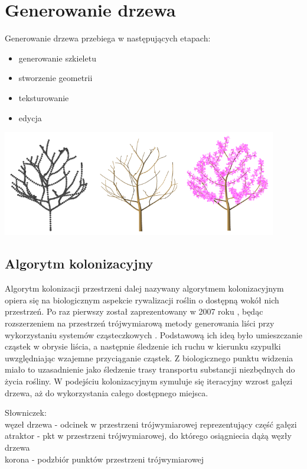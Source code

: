 \section{Generowanie drzewa}
Generowanie drzewa przebiega w następujących etapach:
\begin{itemize}
\item generowanie szkieletu
\item stworzenie geometrii
\item teksturowanie
\item edycja
\end{itemize}
\begin{center}
	\includegraphics[width=120mm]{images/colonization/generation.png}
	\label{two_segments}
\end{center}
\subsection{Algorytm kolonizacyjny}
Algorytm kolonizacji przestrzeni dalej nazywany algorytmem kolonizacyjnym opiera się na biologicznym aspekcie rywalizacji roślin o dostępną wokół nich przestrzeń. 
Po raz pierwszy został zaprezentowany w 2007 roku \cite{spaceColonization}, będąc rozszerzeniem na przestrzeń trójwymiarową metody generowania liści przy wykorzystaniu systemów cząsteczkowych \cite{particleMethod}. 
Podstawową ich ideą było umieszczanie cząstek w obrysie liścia, a następnie śledzenie ich ruchu w kierunku szypułki uwzględniając wzajemne przyciąganie cząstek. 
Z biologicznego punktu widzenia miało to uzasadnienie jako śledzenie trasy transportu substancji niezbędnych do życia rośliny. 
W podejściu kolonizacyjnym symuluje się iteracyjny wzrost gałęzi drzewa, aż do wykorzystania całego dostępnego miejsca.


Słowniczek:\\
węzeł drzewa - odcinek w przestrzeni trójwymiarowej reprezentujący część gałęzi\\
atraktor - pkt w przestrzeni trójwymiarowej, do którego osiągniecia dążą węzły drzewa\\
korona - podzbiór punktów przestrzeni trójwymiarowej\\
